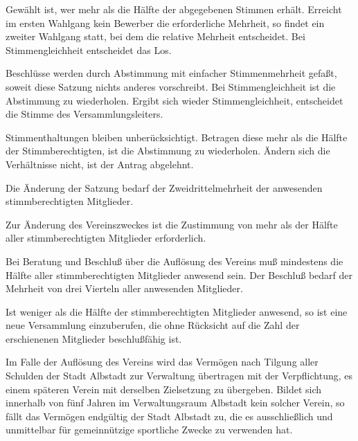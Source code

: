 \documentclass[11pt,a4paper,parskip=half]{scrartcl}
\begin{document}
\begin{contract}
\begin{multicols}{2}
		Gewählt ist,
    wer mehr als die Hälfte der  abgegebenen Stimmen erhält.
    Erreicht im ersten Wahlgang kein Bewerber die erforderliche Mehrheit,
    so findet ein zweiter Wahlgang statt,
    bei dem die relative Mehrheit entscheidet.
    Bei Stimmengleichheit entscheidet das Los.

		Beschlüsse werden durch Abstimmung mit einfacher Stimmenmehrheit gefaßt,
    soweit diese Satzung nichts anderes vorschreibt.
    Bei Stimmengleichheit ist die Abstimmung zu wiederholen.
    Ergibt sich wieder Stimmengleichheit,
    entscheidet die Stimme des Versammlungsleiters.

		Stimmenthaltungen bleiben unberücksichtigt.
		Betragen diese mehr als die Hälfte der Stimmberechtigten,
    ist die Abstimmung zu wiederholen.
    Ändern sich die Verhältnisse nicht,
    ist der Antrag abgelehnt.

		Die Änderung der Satzung bedarf der Zweidrittelmehrheit der anwesenden stimmberechtigten Mitglieder.

		Zur Änderung des Vereinszweckes ist die Zustimmung von mehr als der Hälfte aller stimmberechtigten Mitglieder erforderlich.

		Bei Beratung und Beschluß über die Auflösung des Vereins muß mindestens die Hälfte aller stimmberechtigten Mitglieder anwesend sein.
    Der Beschluß bedarf der Mehrheit von drei Vierteln aller anwesenden Mitglieder.

		Ist weniger als die Hälfte der stimmberechtigten Mitglieder anwesend,
    so ist eine neue Versammlung einzuberufen,
    die ohne Rücksicht auf die Zahl der erschienenen Mitglieder beschlußfähig ist.

		Im Falle der Auflösung des Vereins wird das Vermögen nach Tilgung aller Schulden der Stadt Albstadt zur Verwaltung übertragen mit der Verpflichtung,
    es einem späteren Verein mit derselben Zielsetzung zu übergeben.
    Bildet sich innerhalb von fünf Jahren im Verwaltungsraum Albstadt kein solcher Verein,
    so fällt das Vermögen endgültig der Stadt Albstadt zu,
    die es ausschließlich und unmittelbar für gemeinnützige sportliche Zwecke zu verwenden hat.
		\end{multicols}
	\end{contract}	
	
\end{document}
